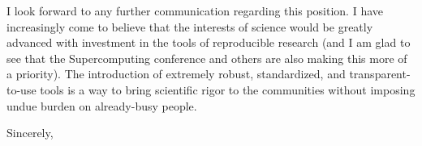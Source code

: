 \documentclass{letter}
\begin{document}
\begin{letter}{}
  I look forward to any further communication regarding this position. I have increasingly come to believe that the interests of science would be greatly advanced with investment in the tools of reproducible research (and I am glad to see that the Supercomputing conference and others are also making this more of a priority). The introduction of extremely robust, standardized, and transparent-to-use tools is a way to bring scientific rigor to the communities without imposing undue burden on already-busy people.

\closing{Sincerely,}
\end{letter}
\end{document}
